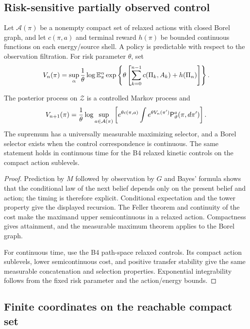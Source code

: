 \subsection{Risk-sensitive partially observed control}

Let $\mathcal A(\pi)$ be a nonempty compact set of relaxed actions with closed
Borel graph, and let $c(\pi,a)$ and terminal reward $h(\pi)$ be bounded
continuous functions on each energy/source shell.  A policy is predictable
with respect to the observation filtration.  For risk parameter $\theta$, set
\[
 V_n(\pi)=\sup_\alpha {1\over\theta}
 \log\mathbb E_\pi^\alpha
 \exp\left\{\theta\left[
 \sum_{k=0}^{n-1}c(\Pi_k,A_k)+h(\Pi_n)
 \right]\right\}.
\]

\begin{theorem}
\label{thm:r21-c1-dpp}
The posterior process on $\mathcal Z$ is a controlled Markov process and
\[
 V_{n+1}(\pi)={1\over\theta}
 \log\sup_{a\in\mathcal A(\pi)}
 \left[e^{\theta c(\pi,a)}
 \int e^{\theta V_n(\pi')}
       \mathsf P_\vartheta^a(\pi,d\pi')\right].
\]
The supremum has a universally measurable maximizing selector, and a Borel
selector exists when the control correspondence is continuous.  The same
statement holds in continuous time for the B4 relaxed kinetic controls on the
compact action sublevels.
\end{theorem}

\begin{proof}
Prediction by $M$ followed by observation by $G$ and Bayes' formula shows that
the conditional law of the next belief depends only on the present belief and
action; the timing is therefore explicit.  Conditional expectation and the
tower property give the displayed recursion.  The Feller theorem and
continuity of the cost make the maximand upper semicontinuous in a relaxed
action.  Compactness gives attainment, and the measurable maximum theorem
applies to the Borel graph.

For continuous time, use the B4 path-space relaxed controls.  Its compact
action sublevels, lower semicontinuous cost, and positive transfer stability
give the same measurable concatenation and selection properties.  Exponential
integrability follows from the fixed risk parameter and the action/energy
bounds.
\end{proof}

\subsection{Finite coordinates on the reachable compact set}

